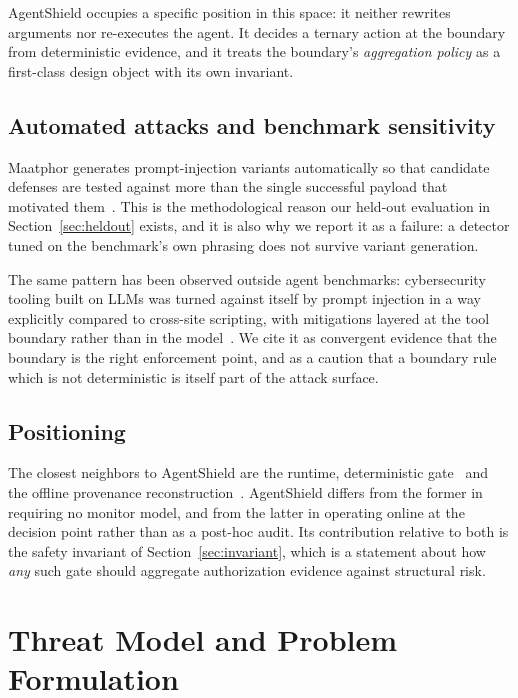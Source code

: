 \documentclass[letterpaper,twocolumn,10pt]{article}
\begin{document}
AgentShield occupies a specific position in this space: it neither rewrites
arguments nor re-executes the agent. It decides a ternary action at the
boundary from deterministic evidence, and it treats the boundary's
\emph{aggregation policy} as a first-class design object with its own
invariant.

\subsection{Automated attacks and benchmark sensitivity}
\label{sec:rw:variants}

Maatphor generates prompt-injection variants automatically so that candidate
defenses are tested against more than the single successful payload that
motivated them~\cite{salem2023maatphor}. This is the methodological reason our
held-out evaluation in Section~\ref{sec:heldout} exists, and it is also why we
report it as a failure: a detector tuned on the benchmark's own phrasing does
not survive variant generation.

The same pattern has been observed outside agent benchmarks: cybersecurity
tooling built on LLMs was turned against itself by prompt injection in a way
explicitly compared to cross-site scripting, with mitigations layered at the
tool boundary rather than in the
model~\cite{mayoralvilches2025cybersecai}. We cite it as convergent evidence
that the boundary is the right enforcement point, and as a caution that a
boundary rule which is not deterministic is itself part of the attack surface.

\subsection{Positioning}
\label{sec:rw:positioning}

The closest neighbors to AgentShield are the runtime, deterministic
gate~\cite{zhao2026clawguard,wang2026agentwatcher} and the offline provenance
reconstruction~\cite{cai2026ghost}. AgentShield differs from the former in
requiring no monitor model, and from the latter in operating online at the
decision point rather than as a post-hoc audit. Its contribution relative to
both is the safety invariant of Section~\ref{sec:invariant}, which is a
statement about how \emph{any} such gate should aggregate authorization
evidence against structural risk.

\section{Threat Model and Problem Formulation}
\label{sec:threat}
\end{document}
